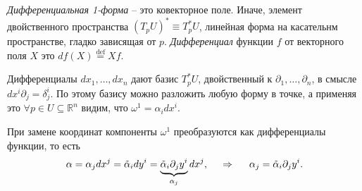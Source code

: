 \begin{to_def} 
    \textit{Дифференциальная 1-форма} -- это ковекторное поле. Иначе, элемент двойственного пространства $(T_p U)^* \equiv T_p^* U$, линейная форма на касательнм пространстве, гладко зависящая от $p$. 
    \textit{Дифференциал} функции $f$ от векторного поля $X$ это $df (X) \overset{\mathrm{def}}{=} X f$.
\end{to_def}

Дифференциалы $dx_1, \ldots, dx_n$ дают базис $T_p^* U$, двойственный к $\partial_1, \ldots, \partial_n$, в смысле $dx^i \partial_j = \delta_j^i$. По этому базису можно разложить любую форму в точке, а применяя это $\forall p \in U \subseteq \mathbb{R}^n$ видим, что $\omega^1 = \alpha_i dx^i$.


При замене координат компоненты $\omega^1$ преобразуются как дифференциалы функции, то есть 
\begin{equation*}
    \alpha = \alpha_j dx^j = \tilde \alpha_i dy^i = 
    \underbrace{\tilde \alpha_i \partial_j y^i }_{\alpha_j}
    dx^j, \hspace{0.5cm} \Rightarrow \hspace{0.5cm} 
    \alpha_j = \tilde \alpha_i \partial_j y^i.
\end{equation*}





